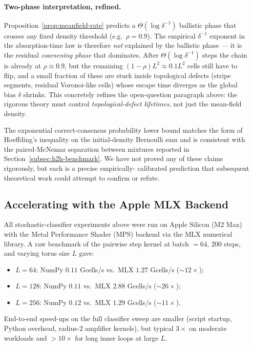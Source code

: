 \documentclass[11pt,a4paper]{article}
\begin{document}
\paragraph{Two-phase interpretation, refined.}
Proposition~\ref{prop:meanfield-rate} predicts a
\(\Theta(\log \delta^{-1})\) ballistic phase that crosses any fixed
density threshold (e.g.\ \(\rho = 0.9\)).  The empirical \(\delta^{-1}\)
exponent in the absorption-time law is therefore \emph{not} explained
by the ballistic phase --- it is the residual \emph{coarsening phase}
that dominates.  After \(\Theta(\log \delta^{-1})\) steps the chain is
already at \(\rho \approx 0.9\), but the remaining
\((1 - \rho) L^2 \approx 0.1 L^2\) cells still have to flip, and a
small fraction of these are stuck inside topological defects
(stripe segments, residual Voronoi-like cells) whose escape time
diverges as the global bias \(\delta\) shrinks.  This concretely
refines the open-question paragraph above: the rigorous theory must
control \emph{topological-defect lifetimes}, not just the mean-field
density.

The exponential correct-consensus probability lower bound matches the
form of Hoeffding's inequality on the initial-density Bernoulli sum
and is consistent with the paired-McNemar separation between mixtures
reported in Section~\ref{subsec:h2h-benchmark}.  We have not proved
any of these claims rigorously, but each is a precise empirically-
calibrated prediction that subsequent theoretical work could attempt
to confirm or refute.

\subsection{Accelerating with the Apple MLX Backend}
\label{subsec:mlx}

All stochastic-classifier experiments above were run on Apple Silicon (M2
Max) with the Metal Performance Shader (MPS) backend via the MLX numerical
library.  A raw benchmark of the pairwise step kernel at batch \(=64\),
\(200\) steps, and varying torus size \(L\) gave:
\begin{itemize}
\item \(L=64\): NumPy \(0.11\) Gcells/s vs.\ MLX \(1.27\) Gcells/s (\(\sim
12{\times}\));
\item \(L=128\): NumPy \(0.11\) vs.\ MLX \(2.88\) Gcells/s (\(\sim 26{\times}\));
\item \(L=256\): NumPy \(0.12\) vs.\ MLX \(1.29\) Gcells/s (\(\sim 11{\times}\)).
\end{itemize}
End-to-end speed-ups on the full classifier sweep are smaller (script
startup, Python overhead, radius-2 amplifier kernels), but typical \(3\times\)
on moderate workloads and \(>10\times\) for long inner loops at large \(L\).
\end{document}

